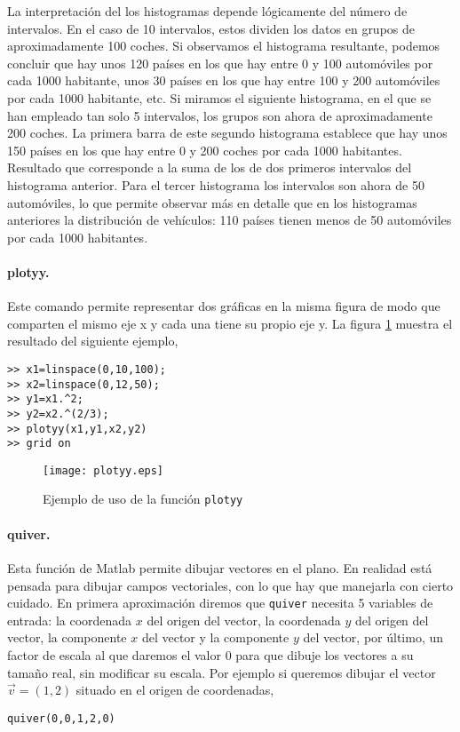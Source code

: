 La interpretación del los histogramas depende lógicamente del número de intervalos. En el caso de 10 intervalos, estos dividen los datos en grupos de aproximadamente 100 coches. Si observamos el histograma resultante, podemos concluir que hay unos 120 países en los que hay entre 0 y 100 automóviles por cada 1000 habitante, unos 30 países en los que hay entre 100 y 200 automóviles por cada 1000 habitante, etc. Si miramos el siguiente histograma, en el que se han empleado tan solo 5 intervalos, los grupos son ahora de aproximadamente 200 coches. La primera barra de este segundo histograma establece que hay unos 150 países en los que hay entre 0 y 200 coches por cada 1000 habitantes. Resultado que corresponde a la suma de los de dos primeros intervalos del histograma anterior. Para el tercer histograma los intervalos son ahora de 50 automóviles, lo que permite observar más en detalle que en los histogramas anteriores la distribución de vehículos: 110 países tienen menos de 50 automóviles por cada 1000 habitantes.

\paragraph{plotyy.} Este comando permite representar dos gráficas en la misma figura de modo que comparten el mismo eje x y cada una tiene su propio eje y. La figura \ref{fig:plotyy} muestra el resultado del siguiente ejemplo,

\begin{verbatim}
>> x1=linspace(0,10,100);
>> x2=linspace(0,12,50);
>> y1=x1.^2;
>> y2=x2.^(2/3);
>> plotyy(x1,y1,x2,y2)
>> grid on
\end{verbatim}

\begin{figure}[h]
\centering
\texttt{[image: plotyy.eps]}
\caption{Ejemplo de uso de la función \texttt{plotyy}}
\label{fig:plotyy}
\end{figure}

\paragraph{quiver.} Esta función de Matlab permite dibujar vectores en el plano. En realidad está pensada para dibujar campos vectoriales, con lo que hay que manejarla con cierto cuidado. En primera aproximación diremos que \texttt{quiver} necesita 5 variables de entrada: la coordenada $x$ del origen del vector, la coordenada $y$ del origen del vector, la componente $x$ del vector y la componente $y$ del vector, por último, un factor de escala al que daremos el valor $0$ para que dibuje los vectores a su tamaño real, sin modificar su escala. Por ejemplo si queremos dibujar el vector $\vec{v}=(1,2)$ situado en el origen de coordenadas,
\begin{verbatim}
quiver(0,0,1,2,0)
\end{verbatim}

